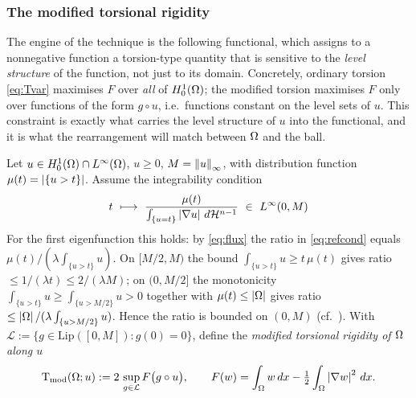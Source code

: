 \subsubsection*{The modified torsional rigidity}

The engine of the technique is the following functional, which assigns to a
nonnegative function a torsion-type quantity that is sensitive to the
\emph{level structure} of the function, not just to its domain. Concretely,
ordinary torsion \eqref{eq:Tvar} maximises $F$ over \emph{all} of
$H^1_0(\Omega)$; the modified torsion maximises $F$ only over functions of the
form $g\circ u$, i.e.\ functions constant on the level sets of $u$. This
constraint is exactly what carries the level structure of $u$ into the
functional, and it is what the rearrangement will match between $\Omega$ and
the ball.

\begin{definition}\label{def:tmod}
Let $u\in H^1_0(\Omega)\cap L^\infty(\Omega)$, $u\ge0$, $M=\left\|u\right\|_\infty$, with
distribution function $\mu(t)=\left|\{u>t\}\right|$. Assume the integrability
condition
\begin{equation}\label{eq:refcond}
  t\ \longmapsto\ \frac{\mu(t)}{\int_{\{u=t\}}\abs{\nabla u}\dH}\ \in\ L^\infty(0,M)
\end{equation}
For the first eigenfunction this holds: by \eqref{eq:flux} the ratio in
\eqref{eq:refcond} equals $\mu(t)/(\lambda\int_{\{u>t\}}u)$. On $[M/2,M)$ the
bound $\int_{\{u>t\}}u\ge t\,\mu(t)$ gives ratio $\le 1/(\lambda t)\le
2/(\lambda M)$; on $(0,M/2]$ the monotonicity $\int_{\{u>t\}}u\ge
\int_{\{u>M/2\}}u>0$ together with $\mu(t)\le\left|\Omega\right|$ gives ratio $\le
\left|\Omega\right|/(\lambda\int_{\{u>M/2\}}u)$. Hence the ratio is bounded on $(0,M)$
(cf.~\cite[Lem.~3.2]{Brasco2014}). With
$\mathcal L:=\{g\in\mathrm{Lip}([0,M]):g(0)=0\}$, define the
\emph{modified torsional rigidity of $\Omega$ along $u$}
\begin{equation}\label{eq:tmod-def}
  \operatorname{T_{\mathrm{mod}}}(\Omega;u):=2\,\sup_{g\in\mathcal L}F\bigl(g\circ u\bigr),
  \qquad F(w)=\int_\Omega w\,dx-\tfrac12\int_\Omega\left|\nabla w\right|^2\,dx .
\end{equation}
\end{definition}

